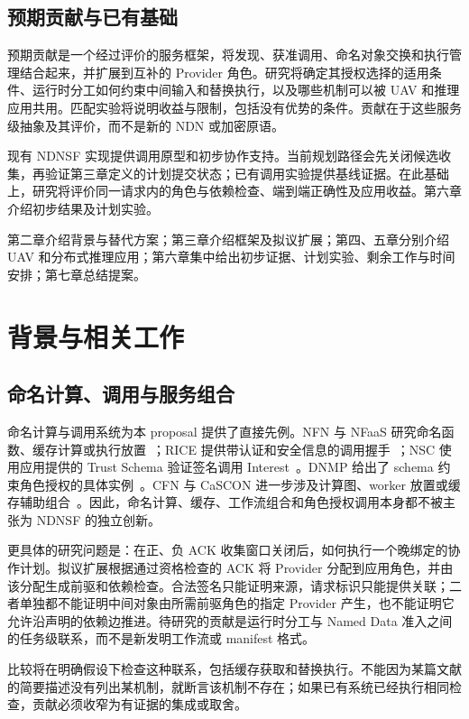

\section{预期贡献与已有基础}
预期贡献是一个经过评价的服务框架，将发现、获准调用、命名对象交换和执行管理结合起来，并扩展到互补的 Provider 角色。研究将确定其授权选择的适用条件、运行时分工如何约束中间输入和替换执行，以及哪些机制可以被 UAV 和推理应用共用。匹配实验将说明收益与限制，包括没有优势的条件。贡献在于这些服务级抽象及其评价，而不是新的 NDN 或加密原语。

现有 NDNSF 实现提供调用原型和初步协作支持。当前规划路径会先关闭候选收集，再验证第三章定义的计划提交状态；已有调用实验提供基线证据。在此基础上，研究将评价同一请求内的角色与依赖检查、端到端正确性及应用收益。第六章介绍初步结果及计划实验。

第二章介绍背景与替代方案；第三章介绍框架及拟议扩展；第四、五章分别介绍 UAV 和分布式推理应用；第六章集中给出初步证据、计划实验、剩余工作与时间安排；第七章总结提案。

\chapter{背景与相关工作}


\section{命名计算、调用与服务组合}
命名计算与调用系统为本 proposal 提供了直接先例。NFN 与 NFaaS 研究命名函数、缓存计算或执行放置~\cite{nfn,nfaas}；RICE 提供带认证和安全信息的调用握手~\cite{rice}；NSC 使用应用提供的 Trust Schema 验证签名调用 Interest~\cite{nsc}。DNMP 给出了 schema 约束角色授权的具体实例~\cite{dnmp}。CFN 与 CaSCON 进一步涉及计算图、worker 放置或缓存辅助组合~\cite{cfn,cascon}。因此，命名计算、缓存、工作流组合和角色授权调用本身都不被主张为 NDNSF 的独立创新。

更具体的研究问题是：在正、负 ACK 收集窗口关闭后，如何执行一个晚绑定的协作计划。拟议扩展根据通过资格检查的 ACK 将 Provider 分配到应用角色，并由该分配生成前驱和依赖检查。合法签名只能证明来源，请求标识只能提供关联；二者单独都不能证明中间对象由所需前驱角色的指定 Provider 产生，也不能证明它允许沿声明的依赖边推进。待研究的贡献是运行时分工与 Named Data 准入之间的任务级联系，而不是新发明工作流或 manifest 格式。

比较将在明确假设下检查这种联系，包括缓存获取和替换执行。不能因为某篇文献的简要描述没有列出某机制，就断言该机制不存在；如果已有系统已经执行相同检查，贡献必须收窄为有证据的集成或取舍。

